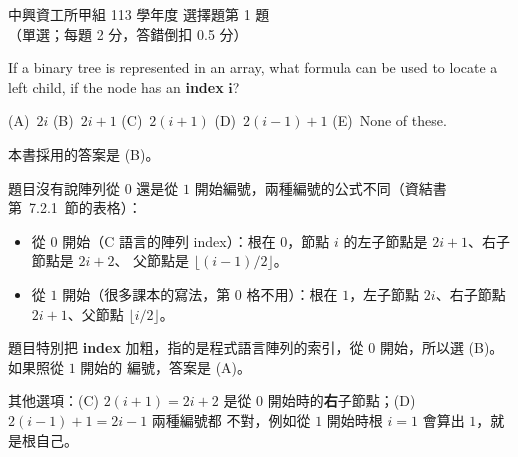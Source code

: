 \begin{pastexam}[label={px:nchu-113-dsa-01}]{中興資工所甲組 113 學年度 選擇題第 1 題}
（單選；每題 2 分，答錯倒扣 0.5 分）

If a binary tree is represented in an array, what formula can be used to locate a left child, if the node
has an \textbf{index} $\boldsymbol{i}$?

(A)~$2i$ \qquad (B)~$2i+1$ \qquad (C)~$2(i+1)$ \qquad (D)~$2(i-1)+1$ \qquad (E)~None of these.
\end{pastexam}

\begin{pastsoln}
本書採用的答案是 (B)。

題目沒有說陣列從 $0$ 還是從 $1$ 開始編號，兩種編號的公式不同（資結書第~7.2.1~節的表格）：
\begin{itemize}
\item 從 $0$ 開始（C 語言的陣列 index）：根在 $0$，節點 $i$ 的左子節點是 $2i + 1$、右子節點是 $2i + 2$、
父節點是 $\lfloor (i - 1)/2 \rfloor$。
\item 從 $1$ 開始（很多課本的寫法，第 $0$ 格不用）：根在 $1$，左子節點 $2i$、右子節點 $2i + 1$、父節點
$\lfloor i/2 \rfloor$。
\end{itemize}
題目特別把 \textbf{index} 加粗，指的是程式語言陣列的索引，從 $0$ 開始，所以選 (B)。 如果照從 $1$ 開始的
編號，答案是 (A)。

其他選項：(C) $2(i + 1) = 2i + 2$ 是從 $0$ 開始時的\textbf{右}子節點；(D) $2(i - 1) + 1 = 2i - 1$ 兩種編號都
不對，例如從 $1$ 開始時根 $i = 1$ 會算出 $1$，就是根自己。
\end{pastsoln}
